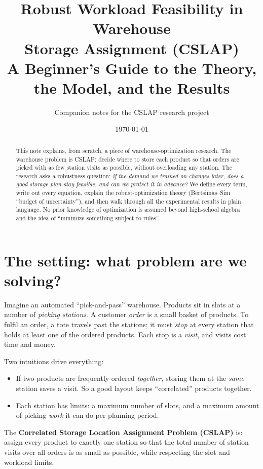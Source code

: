 \documentclass[11pt]{article}
\title{\bf Robust Workload Feasibility in Warehouse\\ Storage Assignment (CSLAP)\\[4pt]
\large A Beginner's Guide to the Theory, the Model, and the Results}
\author{Companion notes for the CSLAP research project}
\date{\today}
\theoremstyle{definition}
\theoremstyle{plain}
\theoremstyle{remark}
\begin{document}
\maketitle

\begin{abstract}
This note explains, from scratch, a piece of warehouse-optimization research.
The warehouse problem is CSLAP: decide where to store each product so that
orders are picked with as few station visits as possible, without overloading
any station. The research asks a robustness question: \emph{if the demand we
trained on changes later, does a good storage plan stay feasible, and can we
protect it in advance?} We define every term, write out every equation, explain
the robust-optimization theory (Bertsimas--Sim ``budget of uncertainty''), and
then walk through all the experimental results in plain language. No prior
knowledge of optimization is assumed beyond high-school algebra and the idea of
``minimize something subject to rules''.
\end{abstract}

\tableofcontents

\section{The setting: what problem are we solving?}

Imagine an automated ``pick-and-pass'' warehouse. Products sit in slots at a
number of \emph{picking stations}. A customer \emph{order} is a small basket of
products. To fulfil an order, a tote travels past the stations; it must
\emph{stop} at every station that holds at least one of the ordered products.
Each stop is a \emph{visit}, and visits cost time and money.

Two intuitions drive everything:
\begin{itemize}[nosep]
  \item If two products are frequently ordered \emph{together}, storing them at
  the \emph{same} station saves a visit. So a good layout keeps
  ``correlated'' products together.
  \item Each station has limits: a maximum number of slots, and a maximum amount
  of picking \emph{work} it can do per planning period.
\end{itemize}

The \textbf{Correlated Storage Location Assignment Problem (CSLAP)} is: assign
every product to exactly one station so that the total number of station visits
over all orders is as small as possible, while respecting the slot and workload
limits.
\end{document}
